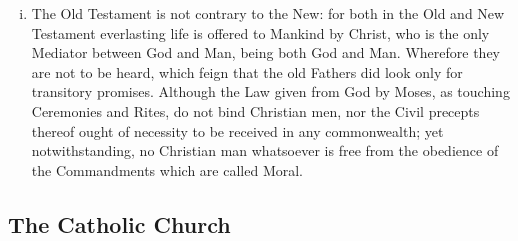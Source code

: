 \begin{enumerate}
	\begin{enumerate}[i.]
		\item The Old Testament is not contrary to the New: for both in the Old and New Testament everlasting life is offered to Mankind by Christ, who is the only Mediator between God and Man, being both God and Man. Wherefore they are not to be heard, which feign that the old Fathers did look only for transitory promises. Although the Law given from God by Moses, as touching Ceremonies and Rites, do not bind Christian men, nor the Civil precepts thereof ought of necessity to be received in any commonwealth; yet notwithstanding, no Christian man whatsoever is free from the obedience of the Commandments which are called Moral.
	\end{enumerate}
\end{enumerate}
\subsection{The Catholic Church}
